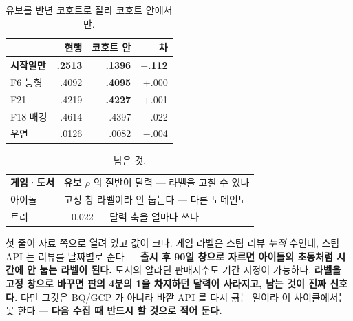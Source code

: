 \documentclass[10pt]{article}
\begin{document}
\begin{table}[t]
\centering\tsize
\caption{유보를 반년 코호트로 잘라 코호트 안에서만.}
\begin{tabular}{lrrr}
\toprule
& 현행 & 코호트 안 & 차 \\
\midrule
\textbf{시작일만} & \textbf{.2513} & \textbf{.1396} & \textbf{$-$.112} \\
\midrule
F6 능형 & .4092 & \textbf{.4095} & $+$.000 \\
F21 & .4219 & \textbf{.4227} & $+$.001 \\
F18 배깅 & .4614 & .4397 & $-$.022 \\
우연 & .0126 & .0082 & $-$.004 \\
\bottomrule
\end{tabular}
\end{table}




\begin{table}[t]
\centering\tsize
\caption{남은 것.}
\begin{tabular}{ll}
\toprule
\textbf{게임·도서} & 유보 $\rho$ 의 절반이 달력 --- 라벨을 고칠 수 있나 \\
아이돌 & 고정 창 라벨이라 안 눕는다 --- 다른 도메인도 \\
트리 & $-$0.022 --- 달력 축을 얼마나 쓰나 \\
\bottomrule
\end{tabular}
\end{table}

첫 줄이 자료 쪽으로 열려 있고 값이 크다. 게임 라벨은 스팀 리뷰 \emph{누적}
수인데, 스팀 API 는 리뷰를 날짜별로 준다 --- \textbf{출시 후 90일 창으로
자르면 아이돌의 초동처럼 시간에 안 눕는 라벨이 된다.} 도서의 알라딘
판매지수도 기간 지정이 가능하다. \textbf{라벨을 고정 창으로 바꾸면 판의
4분의 1을 차지하던 달력이 사라지고, 남는 것이 진짜 신호다.} 다만 그것은
BQ/GCP 가 아니라 바깥 API 를 다시 긁는 일이라 이 사이클에서는 못 한다 ---
\textbf{다음 수집 때 반드시 할 것으로 적어 둔다.}
\end{document}
